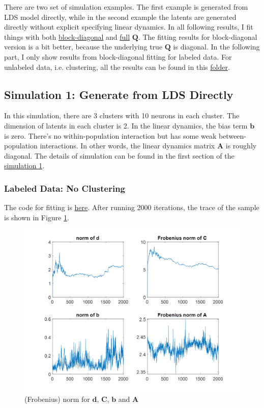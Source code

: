 \documentclass[]{article}
\begin{document}
There are two set of simulation examples. The first example is generated from LDS model directly, while in the second example the latents are generated directly without explicit specifying linear dynamics. In all following results, I fit things with both \href{https://github.com/weigcdsb/state-space-clustering/tree/main/LDS/blkDiag}{block-diagonal} and \href{https://github.com/weigcdsb/state-space-clustering/tree/main/LDS/full}{full} \(\mathbf{Q}\). The fitting results for block-diagonal version is a bit better, because the underlying true \(\mathbf{Q}\) is diagonal. In the following part, I only show results from block-diagonal fitting for labeled data. For unlabeled data, i.e. clustering, all the results can be found in this \href{https://github.com/weigcdsb/state-space-clustering/tree/main/results/gif}{folder}.

\subsection{Simulation 1: Generate from LDS Directly}
In this simulation, there are 3 clusters with 10 neurons in each cluster. The dimension of latents in each cluster is 2. In the linear dynamics, the bias term \(\mathbf{b}\) is zero. There's no within-population interaction but has some weak between-population interactions. In other words, the linear dynamics matrix \(\mathbf{A}\) is roughly diagonal. The details of simulation can be found in the first section of the \href{https://github.com/weigcdsb/state-space-clustering/blob/main/LDS/blkDiag/lds_sample_DP_blkDiag.m}{simulation 1}.

\subsubsection{Labeled Data: No Clustering}
The code for fitting is \href{https://github.com/weigcdsb/state-space-clustering/blob/main/LDS/blkDiag/lds_sample_DP_blkDiag.m}{here}. After running 2000 iterations, the trace of the sample is shown in Figure \ref{lds norms}.
\begin{figure}[h!]
	\centering
	\includegraphics[width = .8\textwidth]{lds_blk_trace.png}
	\caption{(Frobenius) norm for \(\mathbf{d}\), \(\mathbf{C}\), \(\mathbf{b}\) and \(\mathbf{A}\)}
	\label{lds norms}
\end{figure}\\
\end{document}
